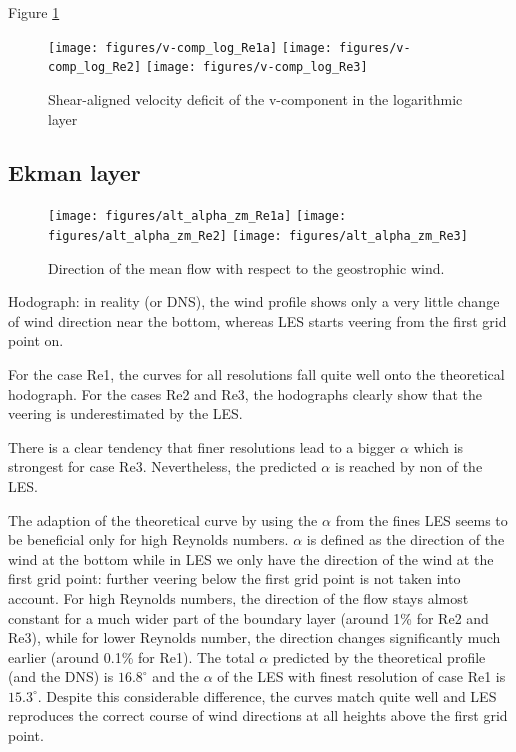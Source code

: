 \documentclass[a4paper,11pt]{article}
\begin{document}
Figure \ref{v-comp_log}
\begin{figure}
  \centerline{
	\texttt{[image: figures/v-comp\_log\_Re1a]}
	\texttt{[image: figures/v-comp\_log\_Re2]}
	\texttt{[image: figures/v-comp\_log\_Re3]}
}
  \caption{Shear-aligned velocity deficit of the v-component in the logarithmic layer}
  \label{v-comp_log}
\end{figure}

\subsection{Ekman layer}


\begin{figure}
  \centerline{
	\texttt{[image: figures/alt\_alpha\_zm\_Re1a]}
	\texttt{[image: figures/alt\_alpha\_zm\_Re2]}
	\texttt{[image: figures/alt\_alpha\_zm\_Re3]}
}
  \caption{Direction of the mean flow with respect to the geostrophic wind. }
  \label{3Re_alpha}
\end{figure}

Hodograph: in reality (or DNS), the wind profile shows only a very little change of wind direction near the bottom, whereas LES starts veering from the first grid point on.

For the case Re1, the curves for all resolutions fall quite well onto the theoretical hodograph. For the cases Re2 and Re3, the hodographs clearly show that the veering is underestimated by the LES.

There is a clear tendency that finer resolutions lead to a bigger $\alpha$ which is strongest for case Re3. Nevertheless, the predicted $\alpha$ is reached by non of the LES.

The adaption of the theoretical curve by using the $\alpha$ from the fines LES seems to be beneficial only for high Reynolds numbers. $\alpha$ is defined as the direction of the wind at the bottom while in LES we only have the direction of the wind at the first grid point: further veering below the first grid point is not taken into account. For high Reynolds numbers, the direction of the flow stays almost constant for a much wider part of the boundary layer (around 1\% for Re2 and Re3), while for lower Reynolds number, the direction changes significantly much earlier (around 0.1\% for Re1). The total $\alpha$ predicted by the theoretical profile (and the DNS) is $16.8^\circ$ and the $\alpha$ of the LES with finest resolution of case Re1 is $15.3^\circ$. Despite this considerable difference, the curves match quite well and LES reproduces the correct course of wind directions at all heights above the first grid point.
\end{document}
